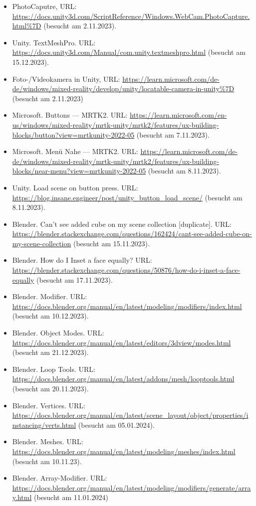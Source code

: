 \begin{itemize}
    \item PhotoCaputre, URL:  \url{https://docs.unity3d.com/ScriptReference/Windows.WebCam.PhotoCapture.html%7D} (besucht am 2.11.2023).
    \item Unity. TextMeshPro. URL: \url{https://docs.unity3d.com/Manual/com.unity.textmeshpro.html} (besucht am 15.12.2023).
    \item Foto-/Videokamera in Unity, URL:  \url{https://learn.microsoft.com/de-de/windows/mixed-reality/develop/unity/locatable-camera-in-unity%7D} (besucht am 2.11.2023)
    \item Microsoft. Buttons — MRTK2. URL: \url{https://learn.microsoft.com/en-us/windows/mixed-reality/mrtk-unity/mrtk2/features/ux-building-blocks/button?view=mrtkunity-2022-05} (besucht am 7.11.2023).
    \item Microsoft. Menü Nahe — MRTK2. URL: \url{https://learn.microsoft.com/de-de/windows/mixed-reality/mrtk-unity/mrtk2/features/ux-building-blocks/near-menu?view=mrtkunity-2022-05} (besucht am 8.11.2023).
    \item Unity. Load scene on button press. URL: \url{https://blog.insane.engineer/post/unity_button_load_scene/} (besucht am 8.11.2023).
    \item Blender. Can't see added cube on my scene collection [duplicate]. URL: \url{https://blender.stackexchange.com/questions/162424/cant-see-added-cube-on-my-scene-collection} (besucht am 15.11.2023).
    \item Blender. How do I Inset a face equally? URL: \url{https://blender.stackexchange.com/questions/50876/how-do-i-inset-a-face-equally} (besucht am 17.11.2023).
    \item Blender. Modifier. URL: \url{https://docs.blender.org/manual/en/latest/modeling/modifiers/index.html} (besucht am 10.12.2023).
    \item Blender. Object Modes. URL: \url{https://docs.blender.org/manual/en/latest/editors/3dview/modes.html} (besucht am 21.12.2023).
    \item Blender. Loop Tools. URL: \url{https://docs.blender.org/manual/en/latest/addons/mesh/looptools.html} (besucht am 20.11.2023).
    \item Blender. Vertices. URL: \url{https://docs.blender.org/manual/en/latest/scene_layout/object/properties/instancing/verts.html} (besucht am 05.01.2024).
    \item Blender. Meshes. URL: \url{https://docs.blender.org/manual/en/latest/modeling/meshes/index.html} (besucht am 10.11.23).
    \item Blender. Array-Modifier. URL: \url{https://docs.blender.org/manual/en/latest/modeling/modifiers/generate/array.html} (besucht am 11.01.2024)

\end{itemize}
